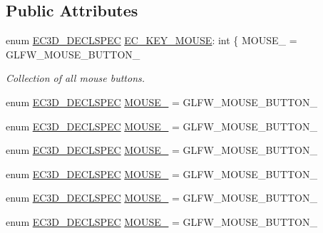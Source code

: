 \subsection*{Public Attributes}
\begin{DoxyCompactItemize}
\item 
enum \mbox{\hyperlink{_common_8h_aac42573e202ca3dd4d259c81691e2369}{E\+C3\+D\+\_\+\+D\+E\+C\+L\+S\+P\+EC}} \mbox{\hyperlink{classec_1_1_mouse_acabdd3509adc381e415c60b29554e2fb}{E\+C\+\_\+\+K\+E\+Y\+\_\+\+M\+O\+U\+SE}}\+: int \{ M\+O\+U\+S\+E\+\_ = G\+L\+F\+W\+\_\+\+M\+O\+U\+S\+E\+\_\+\+B\+U\+T\+T\+O\+N\+\_
\begin{DoxyCompactList}\small\item\em Collection of all mouse buttons. \end{DoxyCompactList}\item 
enum \mbox{\hyperlink{_common_8h_aac42573e202ca3dd4d259c81691e2369}{E\+C3\+D\+\_\+\+D\+E\+C\+L\+S\+P\+EC}} \mbox{\hyperlink{classec_1_1_mouse_abc6758e2f7cbc1a68f7a06fe47658da0}{M\+O\+U\+S\+E\+\_}} = G\+L\+F\+W\+\_\+\+M\+O\+U\+S\+E\+\_\+\+B\+U\+T\+T\+O\+N\+\_
\item 
enum \mbox{\hyperlink{_common_8h_aac42573e202ca3dd4d259c81691e2369}{E\+C3\+D\+\_\+\+D\+E\+C\+L\+S\+P\+EC}} \mbox{\hyperlink{classec_1_1_mouse_aef8f14fad2bb8f10a8511f123fad6d57}{M\+O\+U\+S\+E\+\_}} = G\+L\+F\+W\+\_\+\+M\+O\+U\+S\+E\+\_\+\+B\+U\+T\+T\+O\+N\+\_
\item 
enum \mbox{\hyperlink{_common_8h_aac42573e202ca3dd4d259c81691e2369}{E\+C3\+D\+\_\+\+D\+E\+C\+L\+S\+P\+EC}} \mbox{\hyperlink{classec_1_1_mouse_a3294f278dbfb84d2c0583428db4fbf68}{M\+O\+U\+S\+E\+\_}} = G\+L\+F\+W\+\_\+\+M\+O\+U\+S\+E\+\_\+\+B\+U\+T\+T\+O\+N\+\_
\item 
enum \mbox{\hyperlink{_common_8h_aac42573e202ca3dd4d259c81691e2369}{E\+C3\+D\+\_\+\+D\+E\+C\+L\+S\+P\+EC}} \mbox{\hyperlink{classec_1_1_mouse_a09bfd1f313adb3d6a7a7b2b2be3f2775}{M\+O\+U\+S\+E\+\_}} = G\+L\+F\+W\+\_\+\+M\+O\+U\+S\+E\+\_\+\+B\+U\+T\+T\+O\+N\+\_
\item 
enum \mbox{\hyperlink{_common_8h_aac42573e202ca3dd4d259c81691e2369}{E\+C3\+D\+\_\+\+D\+E\+C\+L\+S\+P\+EC}} \mbox{\hyperlink{classec_1_1_mouse_ad43b84bc1128a214fd0cbbdbcbbf79f2}{M\+O\+U\+S\+E\+\_}} = G\+L\+F\+W\+\_\+\+M\+O\+U\+S\+E\+\_\+\+B\+U\+T\+T\+O\+N\+\_
\item 
enum \mbox{\hyperlink{_common_8h_aac42573e202ca3dd4d259c81691e2369}{E\+C3\+D\+\_\+\+D\+E\+C\+L\+S\+P\+EC}} \mbox{\hyperlink{classec_1_1_mouse_ab7f2eeab8dc21a68af82e877dd980cad}{M\+O\+U\+S\+E\+\_}} = G\+L\+F\+W\+\_\+\+M\+O\+U\+S\+E\+\_\+\+B\+U\+T\+T\+O\+N\+\_

\end{DoxyCompactItemize}
